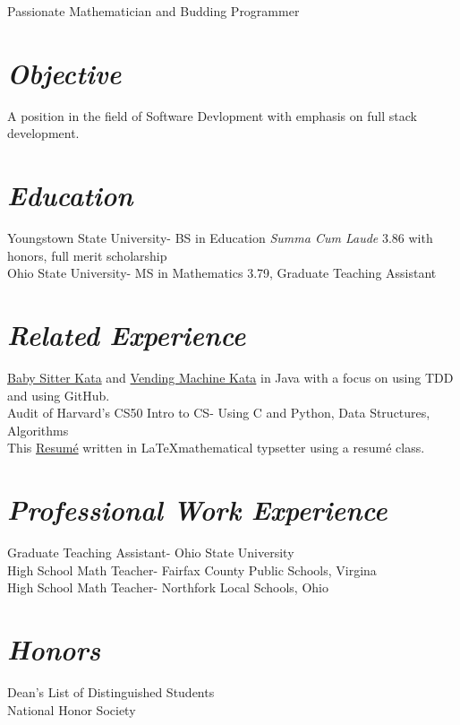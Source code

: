 \documentclass{res}
\begin{document}
 
\begin{resume}

\begin{center}Passionate Mathematician and Budding Programmer\end{center}

\section{\sl  \bf Objective}  %
A  position  in the field of Software Devlopment with 
emphasis on full stack development. 
 
\section{\sl  \bf Education}
Youngstown State University- BS in Education \emph{Summa Cum Laude} 3.86 with honors, full merit scholarship \\
Ohio State University- MS in Mathematics 3.79, Graduate Teaching Assistant\\
 
\section{\sl \bf Related Experience}
\href{https://github.com/smudgegame/Baby-Sitter-Kata}{Baby Sitter Kata} and \href{https://github.com/smudgegame/Better-Vending-Machine}{Vending Machine Kata} in Java with a focus on using TDD and using GitHub. \\

Audit of Harvard's CS50 Intro to CS-  Using C and Python, Data Structures, Algorithms\\



This \href{https://github.com/smudgegame/amresume}{Resum\'e} written in \LaTeX mathematical typsetter using a resum\'e class. 




\section{\sl \bf Professional Work Experience}
Graduate Teaching Assistant- Ohio State University\\
High School Math Teacher- Fairfax County Public Schools, Virgina\\
High School Math Teacher- Northfork Local Schools, Ohio \\

\section{\sl  \bf Honors}
Dean's List of Distinguished Students \\
National Honor Society 


\end{resume}

\vfill 
\end{document}

